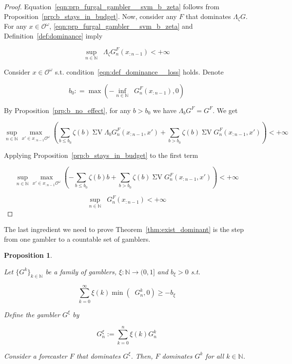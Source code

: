 \documentclass[11pt]{article}
\theoremstyle{definition}
\theoremstyle{plain}
\newtheorem{proposition}{Proposition}%
\newcommand{\Nats}{\mathbb{N}}
\newcommand{\Sq}[2]{\{#1\}_{#2 \in \Nats}}
\newcommand{\Ob}{\mathcal{O}}
\newcommand{\OO}{\Ob^\omega}
\DeclareMathOperator{\SV}{\Sigma V}
\DeclareMathOperator{\SVM}{\Sigma V_{\min}}
\DeclareMathOperator{\SVX}{\Sigma V_{\max}}
\newcommand{\Bd}{\Lambda}
\begin{document}
\begin{proof}

Equation~\ref{eqn:prp_furgal_gambler__svm_b_zeta} follows from Proposition~\ref{prp:b_stays_in_budget}. Now, consider any $F$ that dominates $\Bd_\zeta G$. For any $x \in \OO$, \ref{eqn:prp_furgal_gambler__svm_b_zeta} and Definition~\ref{def:dominance} imply

\[\sup_{n \in \Nats} {\SVX \Bd_\zeta G^F_{n}\left(x_{:n-1}\right)} < +\infty\]

Consider $x \in \OO$ s.t. condition~\ref{eqn:def_dominance__loss} holds. Denote

\[b_0: = \max\left( -\inf_{n \in \Nats} {\SVM G^F_{n}\left(x_{:n-1}\right)},0\right)\]

By Proposition~\ref{prp:b_no_effect}, for any $b > b_0$ we have $\Bd_b G^F = G^F$. We get

\[\sup_{n \in \Nats} \max_{x' \in x_{:n-1}\OO} \left(\sum_{b \leq b_0} \zeta\left(b\right) {\SV \Bd_b G^F_{n}\left(x_{:n-1},x'\right)} + \sum_{b > b_0} \zeta\left(b\right) \SV G^F_{n}\left(x_{:n-1},x'\right)\right) < +\infty\]

Applying Proposition~\ref{prp:b_stays_in_budget} to the first term

\[\sup_{n \in \Nats} \max_{x' \in x_{:n-1}\OO} \left(-\sum_{b \leq b_0} \zeta\left(b\right) b + \sum_{b > b_0} \zeta\left(b\right) \SV G^F_{n}\left(x_{:n-1},x'\right)\right) < +\infty\]

\[\sup_{n \in \Nats} \SVX G^F_{n}\left(x_{:n-1}\right) < +\infty\]
\end{proof}

The last ingredient we need to prove Theorem~\ref{thm:exist_dominant} is the step from one gambler to a countable set of gamblers.

\begin{proposition}
\label{prp:combining_gamblers}

Let $\Sq{G^k}{k}$ be a family of gamblers, $\xi: \Nats \rightarrow (0,1]$ and $b_\xi > 0$ s.t.

\begin{equation}
\label{eqn:prp_combining_gamblers__budget}
\sum_{k = 0}^\infty \xi\left(k\right) \min\left(\SVM G^k_n,0\right) \geq -b_\xi
\end{equation}

Define the gambler $G^\xi$ by

\begin{equation}
G^\xi_n := \sum_{k = 0}^n \xi\left(k\right) G^k_n
\end{equation}

Consider a forecaster $F$ that dominates $G^\xi$. Then, $F$ dominates $G^k$ for all $k \in \Nats$.

\end{proposition}
\end{document}
